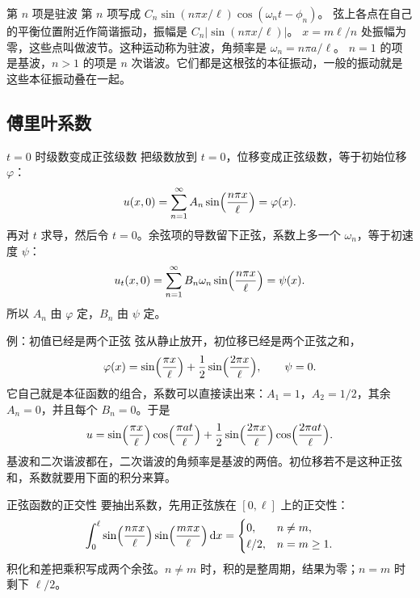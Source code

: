 \documentclass[fontset=windows, chinese, 10pt, xcolor=dvipsnames]{beamer}
\begin{document}
\begin{frame}{第 $n$ 项是驻波}
  第 $n$ 项写成 $C_n\sin(n\pi x/\ell)\cos(\omega_n t-\phi_n)$。
  弦上各点在自己的平衡位置附近作简谐振动，振幅是 $C_n\bigl|\sin(n\pi x/\ell)\bigr|$。
  $x=m\ell/n$ 处振幅为零，这些点叫做波节。这种运动称为驻波，角频率是 $\omega_n=n\pi a/\ell$。
  \vspace{0.3em}
  $n=1$ 的项是基波，$n>1$ 的项是 $n$ 次谐波。它们都是这根弦的本征振动，一般的振动就是这些本征振动叠在一起。
\end{frame}

\subsection{傅里叶系数}

\begin{frame}{$t=0$ 时级数变成正弦级数}
  把级数放到 $t=0$，位移变成正弦级数，等于初始位移 $\varphi$：
  \begin{equation*}
    u(x,0)=\sum_{n=1}^{\infty} A_n\sin\Bigl(\frac{n\pi x}{\ell}\Bigr)=\varphi(x).
  \end{equation*}
  再对 $t$ 求导，然后令 $t=0$。余弦项的导数留下正弦，系数上多一个 $\omega_n$，等于初速度 $\psi$：
  \begin{equation*}
    u_t(x,0)
    =\sum_{n=1}^{\infty} B_n\omega_n\sin\Bigl(\frac{n\pi x}{\ell}\Bigr)
    =\psi(x).
  \end{equation*}
  所以 $A_n$ 由 $\varphi$ 定，$B_n$ 由 $\psi$ 定。
\end{frame}

\begin{frame}{例：初值已经是两个正弦}
  弦从静止放开，初位移已经是两个正弦之和，
  \begin{equation*}
    \varphi(x)=\sin\Bigl(\frac{\pi x}{\ell}\Bigr)
      +\frac12\sin\Bigl(\frac{2\pi x}{\ell}\Bigr),
    \qquad \psi=0.
  \end{equation*}
  它自己就是本征函数的组合，系数可以直接读出来：$A_1=1$，$A_2=1/2$，其余 $A_n=0$，并且每个 $B_n=0$。于是
  \begin{equation*}
    u=\sin\Bigl(\frac{\pi x}{\ell}\Bigr)\cos\Bigl(\frac{\pi a t}{\ell}\Bigr)
     +\frac12\sin\Bigl(\frac{2\pi x}{\ell}\Bigr)
      \cos\Bigl(\frac{2\pi a t}{\ell}\Bigr).
  \end{equation*}
  基波和二次谐波都在，二次谐波的角频率是基波的两倍。初位移若不是这种正弦和，系数就要用下面的积分来算。
\end{frame}

\begin{frame}{正弦函数的正交性}
  要抽出系数，先用正弦族在 $[0,\ell]$ 上的正交性：
  \begin{equation*}
    \int_0^{\ell}
      \sin\Bigl(\frac{n\pi x}{\ell}\Bigr)
      \sin\Bigl(\frac{m\pi x}{\ell}\Bigr)\,\mathrm{d}x
    =
    \begin{cases}
      0, & n\neq m,\\
      \ell/2, & n=m\geq 1.
    \end{cases}
  \end{equation*}
  积化和差把乘积写成两个余弦。$n\neq m$ 时，积的是整周期，结果为零；$n=m$ 时剩下 $\ell/2$。
\end{frame}
\end{document}
